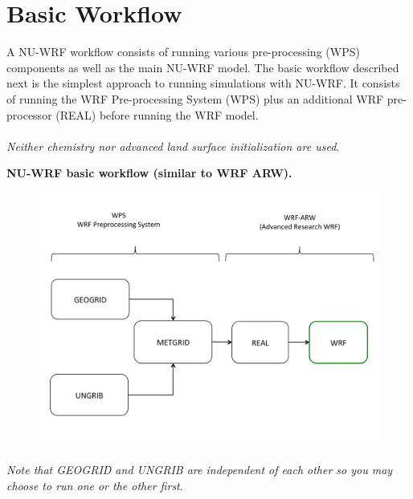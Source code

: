 \section{Basic Workflow}

\begin{frame}

A NU-WRF workflow consists of running various pre-processing  (WPS) components as well as the main NU-WRF model. The basic workflow described next is the simplest approach to running simulations with NU-WRF. It consists of running the WRF Pre-processing System (WPS) plus an additional WRF pre-processor (REAL) before running the WRF model. \\
\mbox{}\\
\emph{Neither chemistry nor advanced land surface initialization are used}.
\mbox{}\\

\end{frame}

\begin{frame}

\centering
\textbf{NU-WRF basic workflow (similar to WRF ARW).}
\begin{figure}[t]
\centering
\includegraphics[scale=.35]{basic-workflow.pdf}
\end{figure}
\tiny{
\emph{Note that GEOGRID and UNGRIB are independent of each other so you may choose to run one or the other first}.
}

\end{frame}

